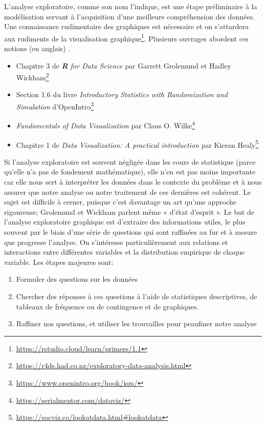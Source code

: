\documentclass[
  11pt,
  letterpaper,
]{book}
\providecommand{\tightlist}{%
  \setlength{\itemsep}{0pt}\setlength{\parskip}{0pt}}
\renewcommand{\href}[2]{#2\footnote{\url{#1}}}
\theoremstyle{definition}
\theoremstyle{definition}
\theoremstyle{definition}
\theoremstyle{remark}
\begin{document}
L'analyse exploratoire, comme son nom l'indique, est une étape préliminaire à la modélisation servant à l'acquisition d'une meilleure compréhension des données.
Une connaissance rudimentaire des graphiques est nécessaire et on s'attardera aux \href{https://rstudio.cloud/learn/primers/1.1}{rudiments de la visualisation graphique}. Plusieurs ouvrages abordent ces notions (en anglais) .

\begin{itemize}
\tightlist
\item
  \href{https://r4ds.had.co.nz/exploratory-data-analysis.html}{Chapitre 3 de \emph{\textbf{R} for Data Science} par Garrett Grolemund et Hadley Wickham}
\item
  \href{https://www.openintro.org/book/isrs/}{Section 1.6 du livre \emph{Introductory Statistics with Randomization and Simulation} d'OpenIntro}
\item
  \href{https://serialmentor.com/dataviz/}{\emph{Fundamentals of Data Visualization} par Claus O. Wilke}
\item
  \href{https://socviz.co/lookatdata.html\#lookatdata}{Chapitre 1 de \emph{Data Visualization: A practical introduction} par Kieran Healy}
\end{itemize}

Si l'analyse exploratoire est souvent négligée dans les cours de statistique (parce qu'elle n'a pas de fondement mathématique), elle n'en est pas moins importante car elle nous sert à interpréter les données dans le contexte du problème et à nous assurer que notre analyse ou notre traitement de ces dernières est cohérent. Le sujet est difficile à cerner, puisque c'est davantage un art qu'une approche rigoureuse; Grolemund et Wickham parlent même « d'état d'esprit ». Le but de l'analyse exploratoire graphique est d'extraire des informations utiles, le plus souvent par le biais d'une série de questions qui sont raffinées au fur et à mesure que progresse l'analyse. On s'intéresse particulièrement aux relations et interactions entre différentes variables et la distribution empirique de chaque variable. Les étapes majeures sont:

\begin{enumerate}
\def\labelenumi{\arabic{enumi}.}
\tightlist
\item
  Formuler des questions sur les données
\item
  Chercher des réponses à ces questions à l'aide de statistiques descriptives, de tableaux de fréquence ou de contingence et de graphiques.
\item
  Raffiner nos questions, et utiliser les trouvailles pour peaufiner notre analyse
\end{enumerate}
\end{document}
